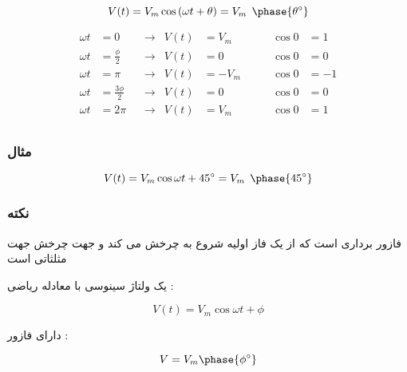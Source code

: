 \documentclass[12pt]{book}
\begin{document}
$$
V(t) = V_{m} \cos{(\omega t + \theta)} = V_{m} \:\: \phase{\theta^{\circ}}
$$


\begin{align*}
\omega t &= 0 & &\to & V(t) &= V_{m} &\qquad \cos{0} &= 1 \\
\omega t &= \frac{\phi}{2} & &\to & V(t) &= 0 &\qquad \cos{0} &= 0 \\
\omega t &= \pi & &\to & V(t) &= - V_{m} &\qquad \cos{0} &= -1 \\
\omega t &= \frac{3 \phi}{2} & &\to & V(t) &= 0 &\qquad \cos{0} &= 0 \\
\omega t &= 2\pi & &\to & V(t) &= V_{m} &\qquad \cos{0} &= 1 \\
\end{align*}


\newpage

\subsubsection{مثال}

\begin{center}
\end{center}

$$
V(t) = V_{m} \cos{\omega t + 45^{\circ}} = V_{m} \:\: \phase{45^{\circ}}
$$



\subsubsection{نکته}

فازور برداری است که از یک فاز اولیه شروع به چرخش می کند و جهت چرخش جهت مثلثاتی است 

یک ولتاژ سینوسی با معادله ریاضی :

$$
V(t) = V_{m} \cos{\omega t + \phi}
$$

دارای فازور :

$$
V = V_{m} \phase{\phi^{\circ}}
$$
\end{document}
